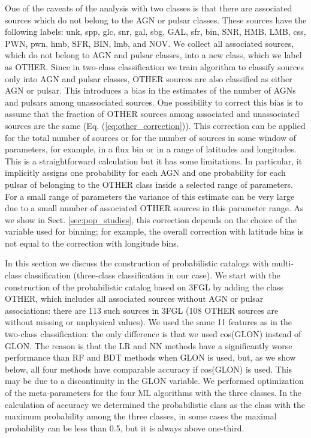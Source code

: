 \documentclass[referee]{aa} %
\begin{document}
One of the caveats of the analysis with two classes is that there are associated sources which do not belong to the AGN or pulsar classes. 
These sources have the following labels: unk, spp, glc, snr, gal, sbg, GAL, sfr, bin, SNR, HMB, LMB, css, PWN, pwn, hmb, SFR, BIN, lmb, and NOV.
We collect all associated sources, which do not belong to AGN and pulsar classes, into a new class, which we label as OTHER.
Since in two-class classification we train algorithm to classify sources only into AGN and pulsar classes, OTHER sources are also classified as either AGN or pulsar.
This introduces a bias in the estimates of the number of AGNs and pulsars among unassociated sources.
One possibility to correct this bias is to assume that the fraction of OTHER sources among associated and unassociated sources are the same (Eq. (\ref{eq:other_correction})).
This correction can be applied for the total number of sources or for the number of sources in some window of parameters,
for example, in a flux bin or in a range of latitudes and longitudes.
This is a straightforward calculation but it has some limitations. 
In particular, it implicitly assigns one probability for each AGN and one probability for each pulsar of belonging to the OTHER class inside a selected range of parameters.
For a small range of parameters the variance of this estimate can be very large due to a small number of associated OTHER sources in this parameter range.
As we show in Sect. \ref{sec:pop_studies}, this correction depends on the choice of the variable used for binning; for example,
the overall correction with latitude bins is not equal to the correction with longitude bins.

In this section we discuss the construction of probabilistic catalogs with multi-class classification (three-class classification in our case).
We start with the construction of the probabilistic catalog based on 3FGL by adding the class OTHER, which includes all associated sources without AGN or pulsar associations: there are 113 such sources in 3FGL (108 OTHER sources are without missing or unphysical values).
We used the same 11 features as in the two-class classification: the only difference is that we used cos(GLON) instead of GLON.
The reason is that the LR and NN methods have a significantly worse performance than RF and BDT methods when GLON is used,
but, as we show below, all four methods have comparable accuracy if cos(GLON) is used.
This may be due to a discontinuity in the GLON variable. 
We performed optimization of the meta-parameters for the four ML algorithms with the three classes.
In the calculation of accuracy we determined the probabilistic class as the class with the maximum probability among the three classes,
in some cases the maximal probability can be less than 0.5, but it is always above one-third.
\end{document}
